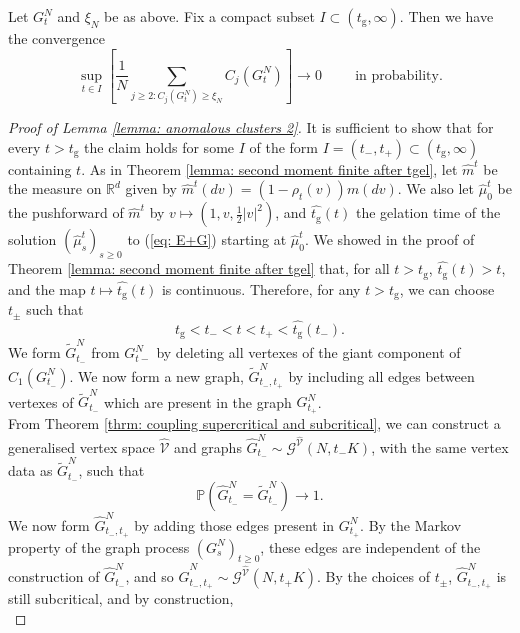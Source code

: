 \begin{lemma}\label{lemma: anomalous clusters 2}
       Let $G^N_t$ and $\xi_N$ be as above. Fix a compact subset $I\subset (t_\mathrm{g}, \infty)$. Then we have the convergence \begin{equation} \sup_{t \in I}\left[\frac{1}{N}\sum_{j\geq 2: C_j(G^N_t)\geq \xi_N} C_j(G^N_t)\right] \rightarrow 0 \hspace{1cm}\text{in probability.}\end{equation}
\end{lemma}
\begin{proof}[Proof of Lemma \ref{lemma: anomalous clusters 2}]  It is sufficient to show that for every $t>t_\mathrm{g}$ the claim holds for some $I$ of the form $I=(t_-, t_+) \subset (t_\mathrm{g}, \infty)$ containing $t$.
As in Theorem \ref{lemma: second moment finite after tgel}, let $\widehat{m}^t$ be the measure on $\mathbb{R}^d$ given by $\widehat{m}^t(dv)=(1-\rho_t(v))m(dv)$. We also let $\widehat{\mu}^t_0$ be the pushforward of $\widehat{m}^t$ by $v\mapsto (1,v,\frac{1}{2}|v|^2)$, and $\widehat{t_\mathrm{g}}(t)$ the gelation time of the solution $(\widehat{\mu}^t_s)_{s\ge 0}$ to (\ref{eq: E+G}) starting at $\widehat{\mu}^t_0$. We showed in the proof of Theorem \ref{lemma: second moment finite after tgel} that, for all $t>t_\mathrm{g}$,  $\widehat{t_\mathrm{g}}(t)>t$, and the map $t\mapsto \widehat{t_\mathrm{g}}(t)$ is continuous. Therefore, for any $t>t_\mathrm{g}$, we can choose $t_\pm$ such that
\begin{equation}
    t_\mathrm{g}<t_-<t<t_+<\widehat{t_\mathrm{g}}(t_-).
\end{equation} We form $\widetilde{G}^N_{t_-}$ from $G^N_{t-}$ by deleting all vertexes of the giant component of $C_1(G^N_{t_-})$. We now form a new graph, $\widetilde{G}^N_{t_-,t_+}$ by including all edges between vertexes of $\widetilde{G}^N_{t_-}$ which are present in the graph $G^N_{t_+}$. \medskip \\ From Theorem \ref{thrm: coupling supercritical and subcritical}, we can construct a generalised vertex space $\widehat{\mathcal{V}}$ and graphs $\widehat{G}^N_{t_-}\sim \mathcal{G}^{\widehat{\mathcal{V}}}(N,t_-K)$, with the same vertex data as $\widetilde{G}^N_{t_-}$, such that \begin{equation}
    \mathbb{P}\left(\widehat{G}^N_{t_-}=\widetilde{G}^N_{t_-}\right)\rightarrow 1.
\end{equation} We now form $\widehat{G}^N_{t_-,t_+}$ by adding those edges present in $G^N_{t_+}$. By the Markov property of the graph process $(G^N_s)_{t\geq 0}$, these edges are independent of the construction of $\widehat{G}^N_{t_-}$, and so $\widehat{G}^N_{t_-,t_+}\sim \mathcal{G}^{\widehat{\mathcal{V}}}(N,t_+K)$. By the choices of $t_\pm$, $\widehat{G}^N_{t_-,t_+}$ is still subcritical, and by construction, \begin{equation}

\end{equation}
\end{proof}

